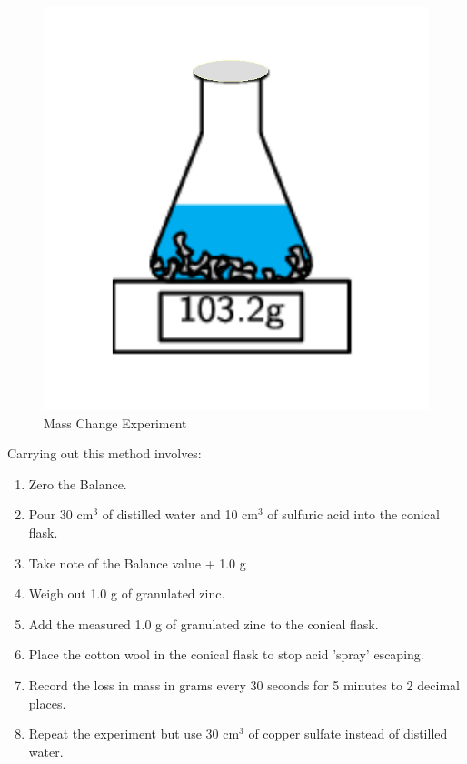 \begin{figure}[H]
    \includegraphics[width=\textwidth]{./Planning/Images/MassChange.pdf}
    \caption{Mass Change Experiment} \label{fig:Mass Change}
\end{figure}


Carrying out this method involves:

\begin{enumerate}
\item Zero the Balance.
\item Pour 30 cm$^3$ of distilled water and 10 cm$^3$ of sulfuric acid into the conical flask.
\item Take note of the Balance value + 1.0 g
\item Weigh out 1.0 g of granulated zinc.
\item Add the measured 1.0 g of granulated zinc to the conical flask.
\item Place the cotton wool in the conical flask to stop acid 'spray' escaping.
\item Record the loss in mass in grams every 30 seconds for 5 minutes to 2 decimal places.
\item Repeat the experiment but use 30 cm$^3$ of copper sulfate instead of distilled water.
\end{enumerate} 

